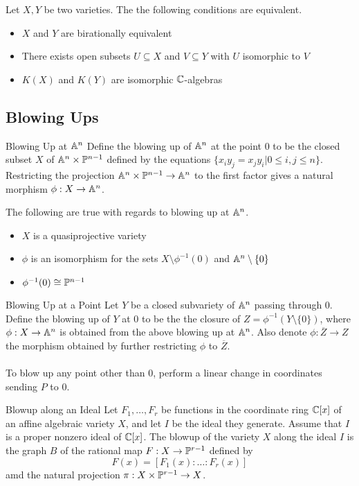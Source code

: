 \documentclass[a4paper]{article}
\begin{document}
\begin{crl}{}{} Let $X,Y$ be two varieties. The the following conditions are equivalent. 
\begin{itemize}
\item $X$ and $Y$ are birationally equivalent
\item There exists open subsets $U\subseteq X$ and $V\subseteq Y$ with $U$ isomorphic to $V$
\item $K(X)$ and $K(Y)$ are isomorphic $\mathbb{C}$-algebras
\end{itemize}
\end{crl}

\subsection{Blowing Ups}
\begin{defn}{Blowing Up at $\mathbb{A}^n$}{} Define the blowing up of $\mathbb{A}^n$ at the point $0$ to be the closed subset $X$ of $\mathbb{A}^n\times\mathbb{P}^{n-1}$ defined by the equations $\{x_iy_j=x_jy_i|0\leq i,j\leq n\}$. Restricting the projection $\mathbb{A}^n\times\mathbb{P}^{n-1}\to\mathbb{A}^n$ to the first factor gives a natural morphism $\phi:X\to\mathbb{A}^n$. 
\end{defn}

\begin{thm}{}{} The following are true with regards to blowing up at $\mathbb{A}^n$. 
\begin{itemize}
\item $X$ is a quasiprojective variety
\item $\phi$ is an isomorphism for the sets $X\setminus\phi^{-1}(0)$ and $\mathbb{A}^n\setminus\{0\}$
\item $\phi^{-1}(0)\cong\mathbb{P}^{n-1}$
\end{itemize}
\end{thm}

\begin{defn}{Blowing Up at a Point}{} Let $Y$ be a closed subvariety of $\mathbb{A}^n$ passing through $0$. Define the blowing up of $Y$ at $0$ to be the the closure of $Z=\phi^{-1}(Y\setminus\{0\})$, where $\phi:X\to\mathbb{A}^n$ is obtained from the above blowing up at $\mathbb{A}^n$. Also denote $\phi:\overline{Z}\to Z$ the morphism obtained by further restricting $\phi$ to $\overline{Z}$. \\~\\
To blow up any point other than $0$, perform a linear change in coordinates sending $P$ to $0$. 
\end{defn}

\begin{defn}{Blowup along an Ideal}{} Let $F_1,\dots,F_r$ be functions in the coordinate ring $\mathbb{C}[x]$ of an affine algebraic variety $X$, and let $I$ be the ideal they generate. Assume that $I$ is a proper nonzero ideal of $\mathbb{C}[x]$. The blowup of the variety $X$ along the ideal $I$ is the graph $B$ of the rational map $F:X\to\mathbb{P}^{r-1}$ defined by $$F(x)=[F_1(x):\dots:F_r(x)]$$ amd the natural projection $\pi:X\times\mathbb{P}^{r-1}\to X$. 
\end{defn}
\end{document}
